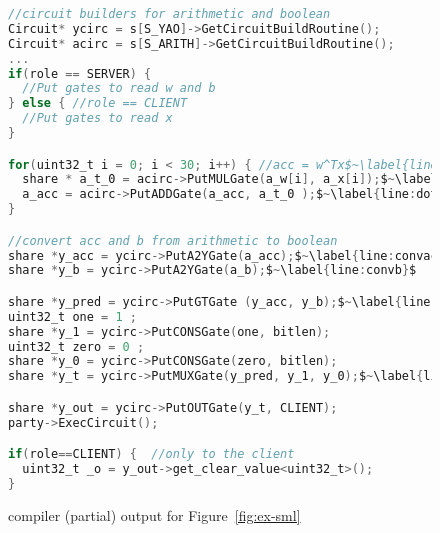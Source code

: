\begin{figure}
\begin{lstlisting}[language=C, mathescape=true]
//circuit builders for arithmetic and boolean
Circuit* ycirc = s[S_YAO]->GetCircuitBuildRoutine();
Circuit* acirc = s[S_ARITH]->GetCircuitBuildRoutine();
...
if(role == SERVER) { 
  //Put gates to read w and b
} else { //role == CLIENT
  //Put gates to read x
}

for(uint32_t i = 0; i < 30; i++) { //acc = w^Tx$~\label{line:dotproductloop}$
  share * a_t_0 = acirc->PutMULGate(a_w[i], a_x[i]);$~\label{line:dotmulgate}$
  a_acc = acirc->PutADDGate(a_acc, a_t_0 );$~\label{line:dotaddgate}$
}

//convert acc and b from arithmetic to boolean
share *y_acc = ycirc->PutA2YGate(a_acc);$~\label{line:convacc}$
share *y_b = ycirc->PutA2YGate(a_b);$~\label{line:convb}$

share *y_pred = ycirc->PutGTGate (y_acc, y_b);$~\label{line:condyaobegin}$
uint32_t one = 1 ;
share *y_1 = ycirc->PutCONSGate(one, bitlen);
uint32_t zero = 0 ;
share *y_0 = ycirc->PutCONSGate(zero, bitlen);
share *y_t = ycirc->PutMUXGate(y_pred, y_1, y_0);$~\label{line:condyaoend}$

share *y_out = ycirc->PutOUTGate(y_t, CLIENT);
party->ExecCircuit();

if(role==CLIENT) {  //only to the client
  uint32_t _o = y_out->get_clear_value<uint32_t>();
}
\end{lstlisting}
\caption{\tool compiler (partial) output for Figure~\ref{fig:ex-sml}}
\label{fig:ex-aby}
\end{figure}
